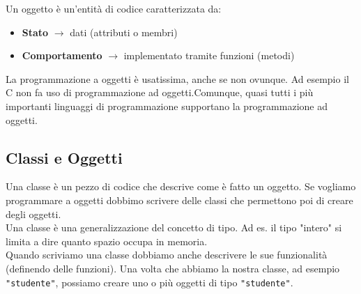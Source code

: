 Un oggetto è un'entità di codice caratterizzata da:
\begin{itemize}
    \item \textbf{Stato} $\rightarrow$ dati (attributi o membri)
    \item \textbf{Comportamento} $\rightarrow$ implementato tramite funzioni (metodi)
\end{itemize}

La programmazione a oggetti è usatissima, anche se non ovunque. Ad esempio il C non fa uso di programmazione ad oggetti.Comunque, quasi tutti i più importanti linguaggi di programmazione supportano la programmazione ad oggetti.\\

\subsection{Classi e Oggetti}

Una classe è un pezzo di codice che descrive come è fatto un oggetto. Se vogliamo programmare a oggetti dobbimo scrivere delle classi che permettono poi di creare degli oggetti.\\
Una classe è una generalizzazione del concetto di tipo. Ad es. il tipo "intero" si limita a dire quanto spazio occupa in memoria.\\ Quando scriviamo una classe dobbiamo anche descrivere le sue funzionalità (definendo delle funzioni).
Una volta che abbiamo la nostra classe, ad esempio \texttt{"studente"}, possiamo creare uno o più oggetti di tipo \texttt{"studente"}.\\

